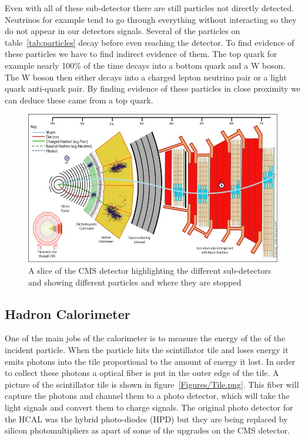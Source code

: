 Even with all of these sub-detector there are still particles not directly detected. Neutrinos for example tend to go through everything without interacting so they do not appear in our detectors signals. Several of the particles on table~\ref{tab:particles} decay before even reaching the detector. To find evidence of these particles we have to find indirect evidence of them. The top quark for example nearly 100\% of the time decays into a bottom quark and a W boson. The W boson then either decays into a charged lepton neutrino pair or a light quark anti-quark pair. By finding evidence of these particles in close proximity we can deduce these came from a top quark.

\begin{figure}
\centering
\includegraphics[width=\linewidth]{Figures/CMSlayout.jpg}
\caption{A slice of the CMS detector highlighting the different sub-detectors and showing different particles and where they are stopped}
\label{fig:CMSlayout}
\end{figure}

\subsection{Hadron Calorimeter}
One of the main jobs of the calorimeter is to measure the energy of the of the incident particle. When the particle hits the scintillator tile and loses energy it emits photons into the tile proportional to the amount of energy it lost. In order to collect these photons a optical fiber is put in the outer edge of the tile. A picture of the scintillator tile is shown in figure~\ref{Figures/Tile.png}. This fiber will capture the photons and channel them to a photo detector, which will take the light signals and convert them to charge signals. The original photo detector for the HCAL was the hybrid photo-diodes (HPD) but they are being replaced by silicon photomultipliers as apart of some of the upgrades on the CMS detector. 

